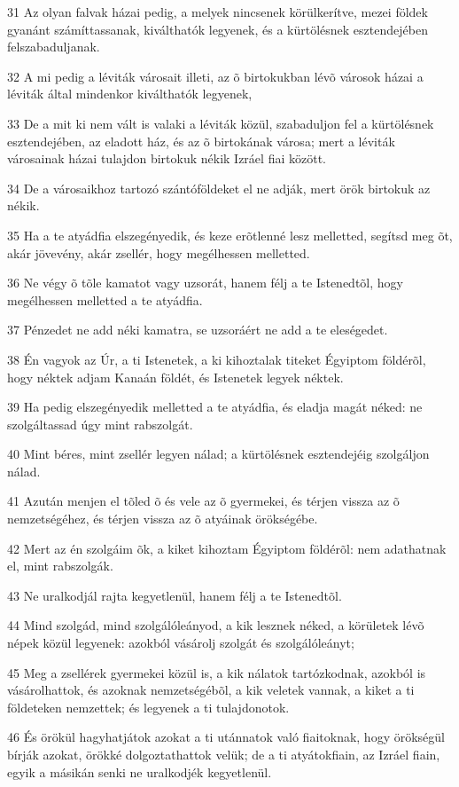 \par 31 Az olyan falvak házai pedig, a melyek nincsenek körülkerítve, mezei földek gyanánt számíttassanak, kiválthatók legyenek, és a kürtölésnek esztendejében felszabaduljanak.
\par 32 A mi pedig a léviták városait illeti, az õ birtokukban lévõ városok házai a léviták által mindenkor kiválthatók legyenek,
\par 33 De a mit ki nem vált is valaki a léviták közül, szabaduljon fel a kürtölésnek esztendejében, az eladott ház, és az õ birtokának városa; mert a léviták városainak házai tulajdon birtokuk nékik Izráel fiai között.
\par 34 De a városaikhoz tartozó szántóföldeket el ne adják, mert örök birtokuk az nékik.
\par 35 Ha a te atyádfia elszegényedik, és keze erõtlenné lesz melletted, segítsd meg õt, akár jövevény, akár zsellér, hogy megélhessen melletted.
\par 36 Ne végy õ tõle kamatot vagy uzsorát, hanem félj a te Istenedtõl, hogy megélhessen melletted a te atyádfia.
\par 37 Pénzedet ne add néki kamatra, se uzsoráért ne add a te eleségedet.
\par 38 Én vagyok az Úr, a ti Istenetek, a ki kihoztalak titeket Égyiptom földérõl, hogy néktek adjam Kanaán földét, és Istenetek legyek néktek.
\par 39 Ha pedig elszegényedik melletted a te atyádfia, és eladja magát néked: ne szolgáltassad úgy mint rabszolgát.
\par 40 Mint béres, mint zsellér legyen nálad; a kürtölésnek esztendejéig szolgáljon nálad.
\par 41 Azután menjen el tõled õ és vele az õ gyermekei, és térjen vissza az õ nemzetségéhez, és térjen vissza az õ atyáinak örökségébe.
\par 42 Mert az én szolgáim õk, a kiket kihoztam Égyiptom földérõl: nem adathatnak el, mint rabszolgák.
\par 43 Ne uralkodjál rajta kegyetlenül, hanem félj a te Istenedtõl.
\par 44 Mind szolgád, mind szolgálóleányod, a kik lesznek néked, a körületek lévõ népek közül legyenek: azokból vásárolj szolgát és szolgálóleányt;
\par 45 Meg a zsellérek gyermekei közül is, a kik nálatok tartózkodnak, azokból is vásárolhattok, és azoknak nemzetségébõl, a kik veletek vannak, a kiket a ti földeteken nemzettek; és legyenek a ti tulajdonotok.
\par 46 És örökül hagyhatjátok azokat a ti utánnatok való fiaitoknak, hogy örökségül bírják azokat, örökké dolgoztathattok velük; de a ti atyátokfiain, az Izráel fiain, egyik a másikán senki ne uralkodjék kegyetlenül.
